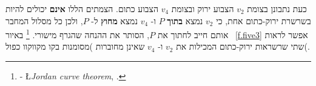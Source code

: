 כעת נתבונן בצומת
$v_2$
הצבוע ירוק ובצומת
$v_4$
הצבוע כתום. הצמתים הללו 
\textbf{אינם}
יכולים להיות בשרשרת ירוק-כתום אחת, כי 
$v_2$
נמצא 
\textbf{בתוך}
$P$
ו-%
$v_4$
נמצא
\textbf{מחוץ}
ל-%
$P$,
ולכן כל מסלול המחבר אותם חייב לחתוך את
$P$,
הסותר את ההנחה שהגרף מישורי.%
\footnote{-%
\L{\emph{Jordan curve theorem}},
.}
באיור~%
\ref{f.five3}
אפשר לראות שתי שרשראות ירוק-כתום המכילות את
$v_2$
ו-%
$v_4$
שאינן מחוברות )מסומנות בקו מקווקוו כפול(.
%
%
%
%  
%
%
